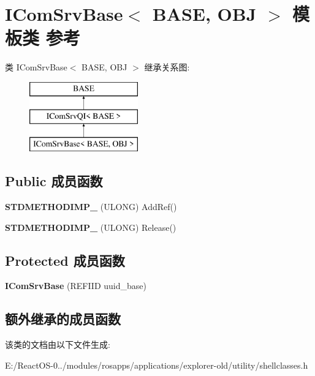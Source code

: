 \hypertarget{class_i_com_srv_base}{}\section{I\+Com\+Srv\+Base$<$ B\+A\+SE, O\+BJ $>$ 模板类 参考}
\label{class_i_com_srv_base}
类 I\+Com\+Srv\+Base$<$ B\+A\+SE, O\+BJ $>$ 继承关系图\+:\begin{figure}[H]
\begin{center}
\leavevmode
\includegraphics[height=3.000000cm]{class_i_com_srv_base}
\end{center}
\end{figure}
\subsection*{Public 成员函数}
\begin{DoxyCompactItemize}
\item 
\mbox{\label{class_i_com_srv_base_a4775a7981a761749d88d977ba0cadcea}} 
{\bfseries S\+T\+D\+M\+E\+T\+H\+O\+D\+I\+M\+P\+\_\+} (U\+L\+O\+NG) Add\+Ref()
\item 
\mbox{\label{class_i_com_srv_base_a55a5abeaa78dce250c6efaee9d028834}} 
{\bfseries S\+T\+D\+M\+E\+T\+H\+O\+D\+I\+M\+P\+\_\+} (U\+L\+O\+NG) Release()
\end{DoxyCompactItemize}
\subsection*{Protected 成员函数}
\begin{DoxyCompactItemize}
\item 
\mbox{\label{class_i_com_srv_base_a950198464dba72893d5a2120950173c8}} 
{\bfseries I\+Com\+Srv\+Base} (R\+E\+F\+I\+ID uuid\+\_\+base)
\end{DoxyCompactItemize}
\subsection*{额外继承的成员函数}


该类的文档由以下文件生成\+:\begin{DoxyCompactItemize}
\item 
E\+:/\+React\+O\+S-\/0../modules/rosapps/applications/explorer-\/old/utility/shellclasses.\+h\end{DoxyCompactItemize}
